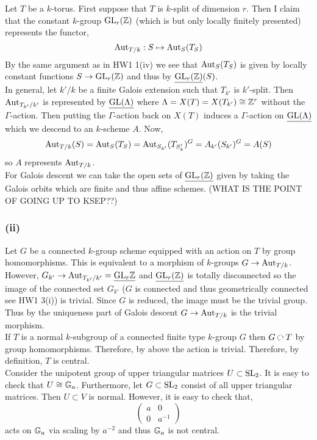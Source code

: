 \documentclass[12pt]{article}
\begin{document}
Let $T$ be a $k$-torus. First suppose that $T$ is $k$-split of dimension $r$. Then I claim that the constant $k$-group $\mathrm{GL}_r(\mathbb{Z})$ (which is \etale but only locally finitely presented) represents the functor,
\[ \mathrm{Aut}_{T/k} : S \mapsto \mathrm{Aut}_S(T_S) \]
By the same argument as in HW1 1(iv) we see that $\mathrm{Aut}_{S}(T_S)$ is given by locally constant functions $S \to \mathrm{GL}_r(\mathbb{Z})$ and thus by $\underline{\mathrm{GL}_r(\mathbb{Z})}(S)$.
\bigskip\\
In general, let $k'/k$ be a finite Galois extension such that $T_{k'}$ is $k'$-split. Then $\mathrm{Aut}_{T_{k'}/k'}$ is represented by $\underline{\mathrm{GL}(\Lambda)}$ where $\Lambda = X(T) = X(T_{k'}) \cong \mathbb{Z}^r$ without the $\Gamma$-action. Then putting the $\Gamma$-action back on $X(T)$ induces a $\Gamma$-action on $\underline{\mathrm{GL}(\Lambda)}$ which we descend to an \etale $k$-scheme $A$. Now,
\[ \mathrm{Aut}_{T/k}(S) = \mathrm{Aut}_{S}(T_S) = \mathrm{Aut}_{S_{k'}}(T_{S_k'})^G = A_{k'}(S_{k'})^G = A(S) \]
so $A$ represents $\mathrm{Aut}_{T/k}$. 
\bigskip\\
For Galois descent we can take the open sets of $\underline{\mathrm{GL}_r(\mathbb{Z})}$ given by taking the Galois orbits which are finite and thus affine schemes. (WHAT IS THE POINT OF GOING UP TO KSEP??)

\subsubsection{(ii)}


Let $G$ be a connected $k$-group scheme equipped with an action on $T$ by group homomorphisms. This is equivalent to a morphism of $k$-groups $G \to \mathrm{Aut}_{T/k}$. However, $G_{k'} \to \mathrm{Aut}_{T_{k'}/k'} = \underline{\mathrm{GL}_r{\mathbb{Z}}}$ and $\underline{\mathrm{GL}_r(\mathbb{Z})}$ is totally disconnected so the image of the connected set $G_{k'}$ ($G$ is connected and thus geometrically connected see HW1 3(i)) is trivial. Since $G$ is reduced, the image must be the trivial group. Thus by the uniqueness part of Galois descent $G \to \mathrm{Aut}_{T/k}$ is the trivial morphism. 
\bigskip\\
If $T$ is a normal $k$-subgroup of a connected finite type $k$-group $G$ then $G \acts T$ by group homomorphisms. Therefore, by above the action is trivial. Therefore, by definition, $T$ is central.
\bigskip\\
Consider the unipotent group of upper triangular matrices $U \subset \mathrm{SL}_2$. It is easy to check that $U \cong \mathbb{G}_a$. Furthermore, let $G \subset \mathrm{SL}_2$ consist of all upper triangular matrices. Then $U \subset V$ is normal. However, it is easy to check that,
\[ 
\begin{pmatrix}
a & 0 
\\
0 & a^{-1} 
\end{pmatrix} \]
acts on $\mathbb{G}_a$ via scaling by $a^{-2}$ and thus $\mathbb{G}_a$ is not central.
\end{document}
